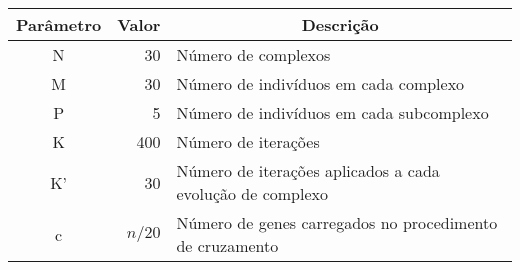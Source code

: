 \begin{tabular}{c|r|l}
\hline
  Parâmetro
   & Valor
   & \multicolumn{1}{c}{Descrição} \\ \hline
  N  &  30    & Número de complexos \\ \hline
  M  &  30    & Número de indivíduos em cada complexo\\ \hline
  P  &   5    & Número de indivíduos em cada subcomplexo\\ \hline
  K  & 400    & Número de iterações\\ \hline
  K' &  30    & Número de iterações aplicados a cada evolução de complexo\\ \hline
  c  & $n/20$ & Número de genes carregados no procedimento de cruzamento\\ \hline
\end{tabular}